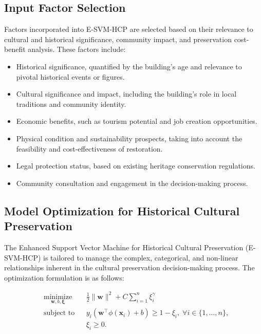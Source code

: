 \documentclass{mcmthesis}
\begin{document}
\subsection{Input Factor Selection}
Factors incorporated into E-SVM-HCP are selected based on their relevance to cultural and historical significance, community impact, and preservation cost-benefit analysis. These factors include:

\begin{itemize}
  \item Historical significance, quantified by the building's age and relevance to pivotal historical events or figures.
  \item Cultural significance and impact, including the building's role in local traditions and community identity.
  \item Economic benefits, such as tourism potential and job creation opportunities.
  \item Physical condition and sustainability prospects, taking into account the feasibility and cost-effectiveness of restoration.
  \item Legal protection status, based on existing heritage conservation regulations.
  \item Community consultation and engagement in the decision-making process.
\end{itemize}

\subsection{Model Optimization for Historical Cultural Preservation}

The Enhanced Support Vector Machine for Historical Cultural Preservation (E-SVM-HCP) is tailored to manage the complex, categorical, and non-linear relationships inherent in the cultural preservation decision-making process. The optimization formulation is as follows:

\begin{equation}
\begin{aligned}
& \underset{\mathbf{w}, b, \boldsymbol{\xi}}{\text{minimize}}
& & \frac{1}{2} \|\mathbf{w}\|^2 + C \sum_{i=1}^{n} \xi_i^\gamma \\
& \text{subject to}
& & y_i(\mathbf{w}^\intercal \phi(\mathbf{x}_i) + b) \geq 1 - \xi_i, \; \forall i \in \{1, \ldots, n\}, \\
&&& \xi_i \geq 0.
\end{aligned}
\end{equation}
\end{document}
